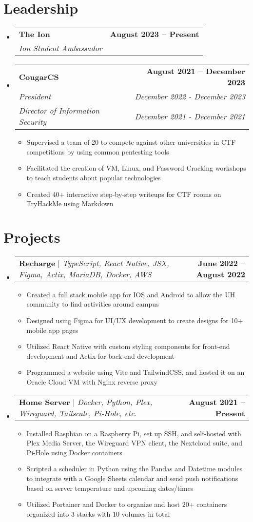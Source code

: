 \documentclass[letterpaper,11pt]{article}
\makeatletter
\newcommand{\resumeItem}[1]{
  \item\small{
    {#1 \vspace{-2pt}}
  }
}
\newcommand{\resumeSubheading}[4]{
  \vspace{-2pt}\item
    \begin{tabular*}{1.0\textwidth}[t]{l@{\extracolsep{\fill}}r}
      \textbf{#1} & \textbf{\small #2} \\
      \textit{\small#3} & \textit{\small #4} \\
    \end{tabular*}\vspace{-7pt}
}
\newcommand{\resumeSubheadingTwoRoles}[6]{
  \vspace{-2pt}\item
    \begin{tabular*}{1.0\textwidth}[t]{l@{\extracolsep{\fill}}r}
      \textbf{#1} & \textbf{\small #2} \\
      \textit{\small#3} & \textit{\small #4} \\
      \textit{\small#5} & \textit{\small #6} \\
    \end{tabular*}\vspace{-7pt}
}
\newcommand{\resumeProjectHeading}[2]{
    \item
    \begin{tabular*}{1.001\textwidth}{l@{\extracolsep{\fill}}r}
      \small#1 & \textbf{\small #2}\\
    \end{tabular*}\vspace{-7pt}
}
\newcommand{\resumeSubHeadingListStart}{\begin{itemize}[leftmargin=0.0in, label={}]}
\newcommand{\resumeSubHeadingListEnd}{\end{itemize}}
\newcommand{\resumeItemListStart}{\begin{itemize}}
\newcommand{\resumeItemListEnd}{\end{itemize}\vspace{-5pt}}
\makeatother
\begin{document}
\section{Leadership}
    \resumeSubHeadingListStart
        \resumeSubheading{The Ion}{August 2023 -- Present}{Ion Student Ambassador}{}
        \resumeSubheadingTwoRoles{CougarCS}{August 2021 -- December 2023}{President}{December 2022 - December 2023}{Director of Information Security}{December 2021 - December 2021}
            \resumeItemListStart
                \resumeItem{Supervised a team of 20 to compete against other universities in CTF competitions by using common pentesting tools}
                \resumeItem{Facilitated the creation of VM, Linux, and Password Cracking workshops to teach students about popular technologies}
                \resumeItem{Created 40+ interactive step-by-step writeups for CTF rooms on TryHackMe using Markdown}
            \resumeItemListEnd
    \resumeSubHeadingListEnd


\section{Projects}
    \vspace{-5pt}
    \resumeSubHeadingListStart
      \resumeProjectHeading
          {\textbf{Recharge} $|$ \emph{TypeScript, React Native, JSX, Figma, Actix, MariaDB, Docker, AWS}}{June 2022 -- August 2022}
          \resumeItemListStart
            \resumeItem{Created a full stack mobile app for IOS and Android to allow the UH community to find activities around campus}
            \resumeItem{Designed using Figma for UI/UX development to create designs for 10+ mobile app pages}
            \resumeItem{Utilized React Native with custom styling components for front-end development and Actix for back-end development}
            \resumeItem{Programmed a website using Vite and TailwindCSS, and hosted it on an Oracle Cloud VM with Nginx reverse proxy}
          \resumeItemListEnd
          \vspace{-13pt}
        \resumeProjectHeading
          {\textbf{Home Server} $|$ \emph{Docker, Python, Plex, Wireguard, Tailscale, Pi-Hole, etc.}}{August 2021 -- Present}
          \resumeItemListStart
            \resumeItem{Installed Raspbian on a Raspberry Pi, set up SSH, and self-hosted with Plex Media Server, the Wireguard VPN client, the Nextcloud suite, and Pi-Hole using Docker containers}
            \resumeItem{Scripted a scheduler in Python using the Pandas and Datetime modules to integrate with a Google Sheets calendar and send push notifications based on server temperature and upcoming dates/times}
            \resumeItem{Utilized Portainer and Docker to organize and host 20+ containers organized into 3 stacks with 10 volumes in total}
          \resumeItemListEnd 
    \resumeSubHeadingListEnd
\vspace{-15pt}


%
\end{document}
